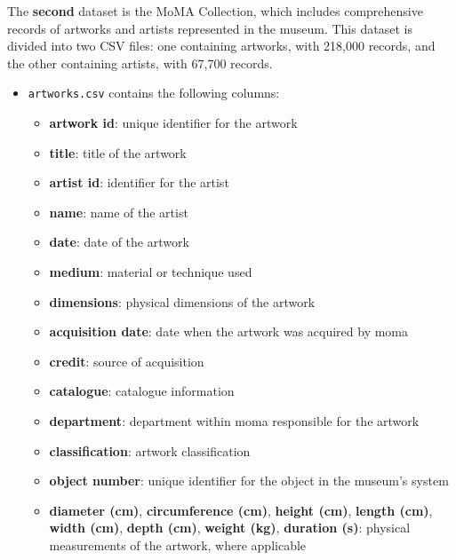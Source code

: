 \documentclass[a4paper,12pt]{article}
\begin{document}
The \textbf{second} dataset is the MoMA Collection, which includes comprehensive records of artworks and artists represented in the museum. This dataset is divided into two CSV files: one containing artworks, with 218,000 records, and the other containing artists, with 67,700 records.
\begin{itemize}
      \item \texttt{artworks.csv} contains the following columns:
            \begin{itemize}
                  \item \textbf{artwork id}: unique identifier for the artwork
                  \item \textbf{title}: title of the artwork
                  \item \textbf{artist id}: identifier for the artist
                  \item \textbf{name}: name of the artist
                  \item \textbf{date}: date of the artwork
                  \item \textbf{medium}: material or technique used
                  \item \textbf{dimensions}: physical dimensions of the artwork
                  \item \textbf{acquisition date}: date when the artwork was acquired by moma
                  \item \textbf{credit}: source of acquisition
                  \item \textbf{catalogue}: catalogue information
                  \item \textbf{department}: department within moma responsible for the artwork
                  \item \textbf{classification}: artwork classification
                  \item \textbf{object number}: unique identifier for the object in the museum’s system
                  \item \textbf{diameter (cm)}, \textbf{circumference (cm)}, \textbf{height (cm)}, \textbf{length (cm)}, \textbf{width (cm)}, \textbf{depth (cm)}, \textbf{weight (kg)}, \textbf{duration (s)}: physical measurements of the artwork, where applicable

            \end{itemize}


\end{itemize}
\end{document}

